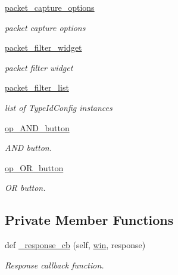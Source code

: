 \begin{DoxyCompactItemize}
\hyperlink{classshow__last__packets_1_1ShowLastPackets_a66331507375ad09ebb8ffae3450ec38c}{packet\+\_\+capture\+\_\+options}
\begin{DoxyCompactList}\small\item\em packet capture options \end{DoxyCompactList}\item 
\hyperlink{classshow__last__packets_1_1ShowLastPackets_ad9cc838d0891495e59911fb9824c2757}{packet\+\_\+filter\+\_\+widget}
\begin{DoxyCompactList}\small\item\em packet filter widget \end{DoxyCompactList}\item 
\hyperlink{classshow__last__packets_1_1ShowLastPackets_afb948244d0751d3a493657bb1b3af47f}{packet\+\_\+filter\+\_\+list}
\begin{DoxyCompactList}\small\item\em list of Type\+Id\+Config instances \end{DoxyCompactList}\item 
\hyperlink{classshow__last__packets_1_1ShowLastPackets_a07104402efbfb3aad2e48ad3a979e9d1}{op\+\_\+\+A\+N\+D\+\_\+button}
\begin{DoxyCompactList}\small\item\em A\+ND button. \end{DoxyCompactList}\item 
\hyperlink{classshow__last__packets_1_1ShowLastPackets_a5aab12d35452ca9ac07f85777b7850d2}{op\+\_\+\+O\+R\+\_\+button}
\begin{DoxyCompactList}\small\item\em OR button. \end{DoxyCompactList}\end{DoxyCompactItemize}
\subsection*{Private Member Functions}
\begin{DoxyCompactItemize}
\item 
def \hyperlink{classshow__last__packets_1_1ShowLastPackets_a139b1805186f1c85f3a71331948a08dc}{\+\_\+response\+\_\+cb} (self, \hyperlink{classshow__last__packets_1_1ShowLastPackets_a6a9100fa3cf84db3e07a20e257adb254}{win}, response)
\begin{DoxyCompactList}\small\item\em Response callback function. \end{DoxyCompactList}\end{DoxyCompactItemize}


